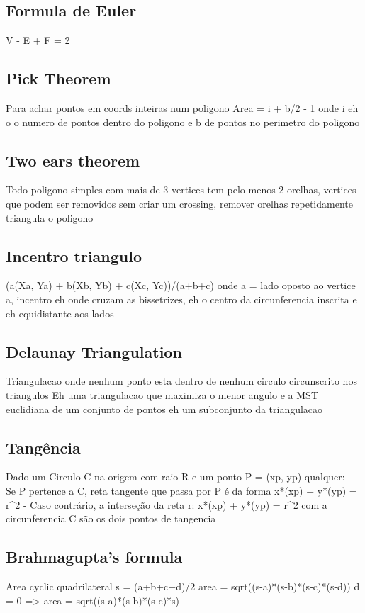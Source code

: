 \documentclass{article}
\begin{document}
\subsection{Formula de Euler}
V - E + F = 2
\subsection{Pick Theorem} Para achar pontos em coords inteiras num poligono Area = i + b/2 - 1 onde i eh o o numero de pontos dentro do poligono e b de pontos no perimetro do poligono
\subsection{Two ears theorem} Todo poligono simples com mais de 3 vertices tem pelo menos 2 orelhas, vertices que podem ser removidos sem criar um crossing, remover orelhas repetidamente triangula o poligono
\subsection{Incentro triangulo}  (a(Xa, Ya) + b(Xb, Yb) + c(Xc, Yc))/(a+b+c) onde a = lado oposto ao vertice a, incentro eh onde cruzam as bissetrizes, eh o centro da circunferencia inscrita e eh equidistante aos lados

\subsection{Delaunay Triangulation} Triangulacao onde nenhum ponto esta dentro de nenhum circulo circunscrito nos triangulos
Eh uma triangulacao que maximiza o menor angulo e a MST euclidiana de um conjunto de pontos eh um subconjunto da triangulacao

\subsection{Tangência}
Dado um Circulo C na origem com raio R e um ponto P = (xp, yp) qualquer:
  - Se P pertence a C, reta tangente que passa por P é da forma x*(xp) + y*(yp) = r^2
  - Caso contrário, a interseção da reta r: x*(xp) + y*(yp) = r^2 com a circunferencia C são os dois pontos de tangencia


\subsection{Brahmagupta’s formula} Area cyclic quadrilateral
s = (a+b+c+d)/2
area = sqrt((s-a)*(s-b)*(s-c)*(s-d))
d = 0 => area = sqrt((s-a)*(s-b)*(s-c)*s)
\end{document}
